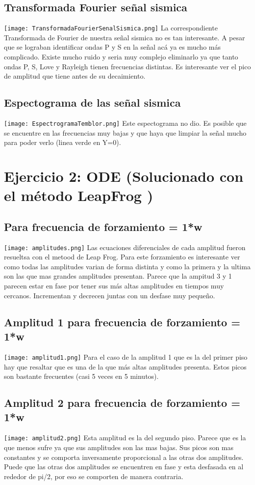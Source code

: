 \documentclass[11pt,letterpaper]{exam}
\begin{document}
\subsection{ Transformada Fourier señal sismica}
\texttt{[image: TransformadaFourierSenalSismica.png]}
La correspondiente Transformada de Fourier de nuestra señal sismica no es tan interesante. A pesar que se lograban identificar ondas P y S en la señal acá ya es mucho más complicado. Existe mucho ruido y seria muy complejo eliminarlo ya que tanto ondas P, S, Love y Rayleigh tienen frecuencias distintas. Es interesante ver el pico de amplitud que tiene antes de su decaimiento.


\subsection{ Espectograma de las señal sismica}
\texttt{[image: EspectrogramaTemblor.png]}
Este espectograma no dio. Es posible que se encuentre en las frecuencias muy bajas y que haya que limpiar la señal mucho para poder verlo (linea verde en Y=0).

\section{Ejercicio 2: ODE (Solucionado con el método LeapFrog )}
\subsection{ Para frecuencia de forzamiento = 1*w}
\texttt{[image: amplitudes.png]}
Las ecuaciones diferenciales de cada amplitud fueron resueltsa con el metood de Leap Frog. Para este forzamiento es interesante ver como todas las amplitudes varian de forma distinta y como la primera y la ultima son las que mas grandes amplitudes presentan. Parece que la ampitud 3 y 1 parecen estar en fase por tener sus más altas amplitudes en tiempos muy cercanos. Incrementan y decrecen juntas con un desfase muy pequeño.


\subsection{ Amplitud 1 para frecuencia de forzamiento = 1*w}
\texttt{[image: amplitud1.png]}
Para el caso de la amplitud 1 que es la del primer piso hay que resaltar que es una de la que más altas amplitudes presenta. Estos picos son bastante frecuentes (casi 5 veces en 5 minutos).


\subsection{ Amplitud 2 para frecuencia de forzamiento = 1*w}
\texttt{[image: amplitud2.png]}
Esta amplitud es la del segundo piso. Parece que es la que menos sufre ya que sus amplitudes son las mas bajas. Sus picos son mas constantes y se comporta inversamente proporcional a las otras dos amplitudes. Puede que las otras dos amplitudes se encuentren en fase y esta desfasada en al rededor de pi/2, por eso se comporten de manera contraria.
\end{document}
